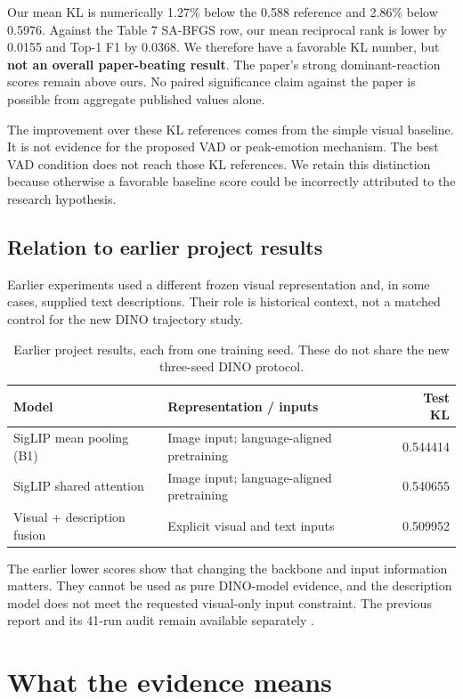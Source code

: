 \documentclass[11pt,a4paper]{article}
\begin{document}
Our mean KL is numerically 1.27\% below the 0.588 reference and 2.86\% below 0.5976. Against the Table 7 SA-BFGS row, our mean reciprocal rank is lower by 0.0155 and Top-1 F1 by 0.0368. We therefore have a favorable KL number, but \textbf{not an overall paper-beating result}. The paper's strong dominant-reaction scores remain above ours. No paired significance claim against the paper is possible from aggregate published values alone.

The improvement over these KL references comes from the simple visual baseline. It is not evidence for the proposed VAD or peak-emotion mechanism. The best VAD condition does not reach those KL references. We retain this distinction because otherwise a favorable baseline score could be incorrectly attributed to the research hypothesis.

\subsection{Relation to earlier project results}\label{sec:prior}
Earlier experiments used a different frozen visual representation and, in some cases, supplied text descriptions. Their role is historical context, not a matched control for the new DINO trajectory study.

\begin{table}[htbp]\centering
\caption{Earlier project results, each from one training seed. These do not share the new three-seed DINO protocol.}
\begin{tabularx}{\linewidth}{p{5.7cm}Xr}\toprule
Model & Representation / inputs & Test KL\\\midrule
SigLIP mean pooling (B1) & Image input; language-aligned pretraining & 0.544414\\
SigLIP shared attention & Image input; language-aligned pretraining & 0.540655\\
Visual + description fusion & Explicit visual and text inputs & 0.509952\\\bottomrule
\end{tabularx}\end{table}

The earlier lower scores show that changing the backbone and input information matters. They cannot be used as pure DINO-model evidence, and the description model does not meet the requested visual-only input constraint. The previous report and its 41-run audit remain available separately \cite{earlier}.

\section{What the evidence means}
\end{document}
